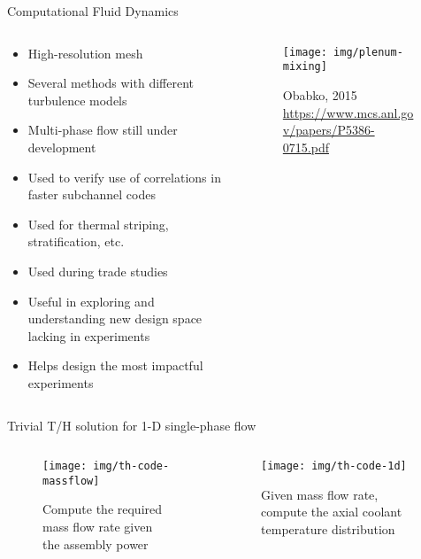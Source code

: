 \documentclass[pdf,aspectratio=169]{beamer}
\begin{document}
\begin{frame}{Computational Fluid Dynamics}

\begin{columns}
    \begin{column}{0.7\textwidth}
    \begin{itemize}
        \item High-resolution mesh 
        \item Several methods with different turbulence models
        \item Multi-phase flow still under development
        \item Used to verify use of correlations in faster subchannel codes
        \item Used for thermal striping, stratification, etc.
        \item Used during trade studies
        \item Useful in exploring and understanding new design space lacking in
            experiments
        \item Helps design the most impactful experiments
    \end{itemize}
    \end{column}
    \begin{column}{0.3\textwidth}
        \begin{figure}[ht]
        \centering
            \texttt{[image: img/plenum-mixing]}
            \caption{\tiny Obabko, 2015
            \url{https://www.mcs.anl.gov/papers/P5386-0715.pdf}}
        \end{figure}
    \end{column}
\end{columns}
\end{frame}

\begin{frame}{Trivial T/H solution for 1-D single-phase flow}
\begin{columns}
    \begin{column}{0.5\textwidth}
        \begin{figure}[ht]
        \centering
            \texttt{[image: img/th-code-massflow]}
            \caption{\tiny Compute the required mass flow rate given the assembly power } 
        \end{figure}
    \end{column}
    \begin{column}{0.5\textwidth}
        \begin{figure}[ht]
        \centering
            \texttt{[image: img/th-code-1d]}
            \caption{\tiny Given mass flow rate, compute the axial coolant temperature
            distribution} 
        \end{figure}
    \end{column}
\end{columns}
\end{frame}
\end{document}

